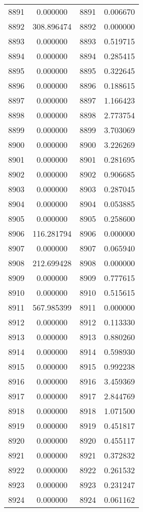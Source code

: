 \documentclass[12pt]{article}
\begin{document}
\begin{longtable}{@{}cccc@{}}
8891 & 0.000000 & 8891 & 0.006670 \\
8892 & 308.896474 & 8892 & 0.000000 \\
8893 & 0.000000 & 8893 & 0.519715 \\
8894 & 0.000000 & 8894 & 0.285415 \\
8895 & 0.000000 & 8895 & 0.322645 \\
8896 & 0.000000 & 8896 & 0.188615 \\
8897 & 0.000000 & 8897 & 1.166423 \\
8898 & 0.000000 & 8898 & 2.773754 \\
8899 & 0.000000 & 8899 & 3.703069 \\
8900 & 0.000000 & 8900 & 3.226269 \\
8901 & 0.000000 & 8901 & 0.281695 \\
8902 & 0.000000 & 8902 & 0.906685 \\
8903 & 0.000000 & 8903 & 0.287045 \\
8904 & 0.000000 & 8904 & 0.053885 \\
8905 & 0.000000 & 8905 & 0.258600 \\
8906 & 116.281794 & 8906 & 0.000000 \\
8907 & 0.000000 & 8907 & 0.065940 \\
8908 & 212.699428 & 8908 & 0.000000 \\
8909 & 0.000000 & 8909 & 0.777615 \\
8910 & 0.000000 & 8910 & 0.515615 \\
8911 & 567.985399 & 8911 & 0.000000 \\
8912 & 0.000000 & 8912 & 0.113330 \\
8913 & 0.000000 & 8913 & 0.880260 \\
8914 & 0.000000 & 8914 & 0.598930 \\
8915 & 0.000000 & 8915 & 0.992238 \\
8916 & 0.000000 & 8916 & 3.459369 \\
8917 & 0.000000 & 8917 & 2.844769 \\
8918 & 0.000000 & 8918 & 1.071500 \\
8919 & 0.000000 & 8919 & 0.451817 \\
8920 & 0.000000 & 8920 & 0.455117 \\
8921 & 0.000000 & 8921 & 0.372832 \\
8922 & 0.000000 & 8922 & 0.261532 \\
8923 & 0.000000 & 8923 & 0.231247 \\
8924 & 0.000000 & 8924 & 0.061162 \\

\end{longtable}
\end{document}
